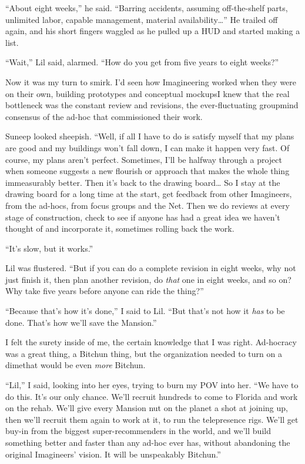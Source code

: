 “About eight weeks,” he said. “Barring accidents, assuming
off-the-shelf parts, unlimited labor, capable management, material
availability…” He trailed off again, and his short fingers waggled
as he pulled up a HUD and started making a list.

“Wait,” Lil said, alarmed. “How do you get from five years to eight
weeks?”

Now it was my turn to smirk. I'd seen how Imagineering worked when
they were on their own, building prototypes and conceptual
mockups{\dash}I knew that the real bottleneck was the constant review and
revisions, the ever-fluctuating groupmind consensus of the ad-hoc
that commissioned their work.

Suneep looked sheepish. “Well, if all I have to do is satisfy
myself that my plans are good and my buildings won't fall down, I
can make it happen very fast. Of course, my plans aren't perfect.
Sometimes, I'll be halfway through a project when someone suggests
a new flourish or approach that makes the whole thing immeasurably
better. Then it's back to the drawing board… So I stay at the
drawing board for a long time at the start, get feedback from other
Imagineers, from the ad-hocs, from focus groups and the Net. Then
we do reviews at every stage of construction, check to see if
anyone has had a great idea we haven't thought of and incorporate
it, sometimes rolling back the work.

“It's slow, but it works.”

Lil was flustered. “But if you can do a complete revision in eight
weeks, why not just finish it, then plan another revision, do
\emph{that} one in eight weeks, and so on? Why take five years
before anyone can ride the thing?”

“Because that's how it's done,” I said to Lil. “But that's not how
it \emph{has} to be done. That's how we'll save the Mansion.”

I felt the surety inside of me, the certain knowledge that I was
right. Ad-hocracy was a great thing, a Bitchun thing, but the
organization needed to turn on a dime{\dash}that would be even
\emph{more} Bitchun.

“Lil,” I said, looking into her eyes, trying to burn my POV into
her. “We have to do this. It's our only chance. We'll recruit
hundreds to come to Florida and work on the rehab. We'll give every
Mansion nut on the planet a shot at joining up, then we'll recruit
them again to work at it, to run the telepresence rigs. We'll get
buy-in from the biggest super-recommenders in the world, and we'll
build something better and faster than any ad-hoc ever has, without
abandoning the original Imagineers' vision. It will be unspeakably
Bitchun.”

